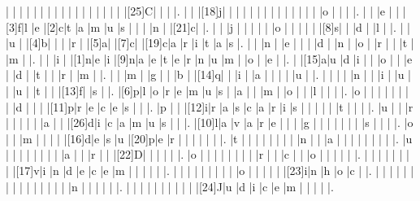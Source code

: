 \documentclass[12pt]{article}
\begin{document}
\begin{Puzzle}{22}{24}
  |{}  |{}  |{}  |{}  |{}  |{}  |{}  |{}  |{}  |{}  |{}  |{}  |{}  |{}  |{}  |{}  |{}  |[25]C|{}  |{}  |{}  |.
  |{}  |{}  |[18]j|{}  |{}  |{}  |{}  |{}  |{}  |{}  |{}  |{}  |{}  |{}  |{}  |{}  |{}  |o   |{}  |{}  |{}  |.
  |{}  |{}  |e   |{}  |{}  |[3]f|l   |e   |[2]c|t   |a   |m   |u   |s   |{}  |{}  |{}  |n   |{}  |[21]c|{}  |.
  |{}  |{}  |j   |{}  |{}  |{}  |{}  |{}  |o   |{}  |{}  |{}  |{}  |{}  |[8]s|{}  |{}  |d   |{}  |l   |{}  |.
  |{}  |{}  |u   |{}  |[4]b|{}  |{}  |{}  |r   |{}  |[5]a|{}  |[7]c|{}  |[19]c|a   |r   |i   |t   |a   |s   |.
  |{}  |{}  |n   |{}  |e   |{}  |{}  |{}  |d   |{}  |n   |{}  |o   |{}  |r   |{}  |{}  |t   |{}  |m   |{}  |.
  |{}  |{}  |i   |{}  |[1]n|e   |i   |[9]n|a   |e   |t   |e   |r   |n   |u   |m   |{}  |o   |{}  |e   |{}  |.
  |{}  |[15]a|u   |d   |i   |{}  |{}  |o   |{}  |{}  |e   |{}  |d   |{}  |t   |{}  |{}  |r   |{}  |m   |{}  |.
  |{}  |{}  |m   |{}  |g   |{}  |{}  |b   |{}  |[14]q|{}  |{}  |i   |{}  |a   |{}  |{}  |{}  |{}  |u   |{}  |.
  |{}  |{}  |{}  |{}  |n   |{}  |{}  |i   |{}  |u   |{}  |{}  |u   |{}  |t   |{}  |{}  |[13]f|{}  |s   |{}  |.
  |[6]p|l   |o   |r   |e   |m   |u   |s   |{}  |a   |{}  |{}  |m   |{}  |o   |{}  |{}  |l   |{}  |{}  |{}  |.
  |o   |{}  |{}  |{}  |{}  |{}  |{}  |{}  |{}  |d   |{}  |{}  |{}  |[11]p|r   |e   |c   |e   |s   |{}  |{}  |.
  |p   |{}  |{}  |[12]i|r   |a   |s   |c   |a   |r   |i   |s   |{}  |{}  |{}  |{}  |{}  |t   |{}  |{}  |{}  |.
  |u   |{}  |{}  |r   |{}  |{}  |{}  |{}  |{}  |a   |{}  |{}  |[26]d|i   |c   |a   |m   |u   |s   |{}  |{}  |.
  |[10]l|a   |v   |a   |r   |e   |{}  |{}  |{}  |g   |{}  |{}  |{}  |{}  |{}  |{}  |{}  |s   |{}  |{}  |{}  |.
  |o   |{}  |{}  |m   |{}  |{}  |{}  |{}  |[16]d|e   |s   |u   |[20]p|e   |r   |{}  |{}  |{}  |{}  |{}  |{}  |.
  |t   |{}  |{}  |{}  |{}  |{}  |{}  |{}  |{}  |n   |{}  |{}  |a   |{}  |{}  |{}  |{}  |{}  |{}  |{}  |{}  |.
  |u   |{}  |{}  |{}  |{}  |{}  |{}  |{}  |{}  |a   |{}  |{}  |r   |{}  |{}  |[22]D|{}  |{}  |{}  |{}  |{}  |.
  |o   |{}  |{}  |{}  |{}  |{}  |{}  |{}  |{}  |r   |{}  |{}  |c   |{}  |{}  |o   |{}  |{}  |{}  |{}  |{}  |.
  |{}  |{}  |{}  |{}  |{}  |{}  |{}  |{}  |[17]v|i   |n   |d   |e   |c   |e   |m   |{}  |{}  |{}  |{}  |{}  |.
  |{}  |{}  |{}  |{}  |{}  |{}  |{}  |{}  |{}  |o   |{}  |{}  |{}  |{}  |{}  |[23]i|n   |h   |o   |c   |{}  |.
  |{}  |{}  |{}  |{}  |{}  |{}  |{}  |{}  |{}  |{}  |{}  |{}  |{}  |{}  |{}  |n   |{}  |{}  |{}  |{}  |{}  |.
  |{}  |{}  |{}  |{}  |{}  |{}  |{}  |{}  |{}  |{}  |[24]J|u   |d   |i   |c   |e   |m   |{}  |{}  |{}  |{}  |.
\end{Puzzle}
\end{document}
